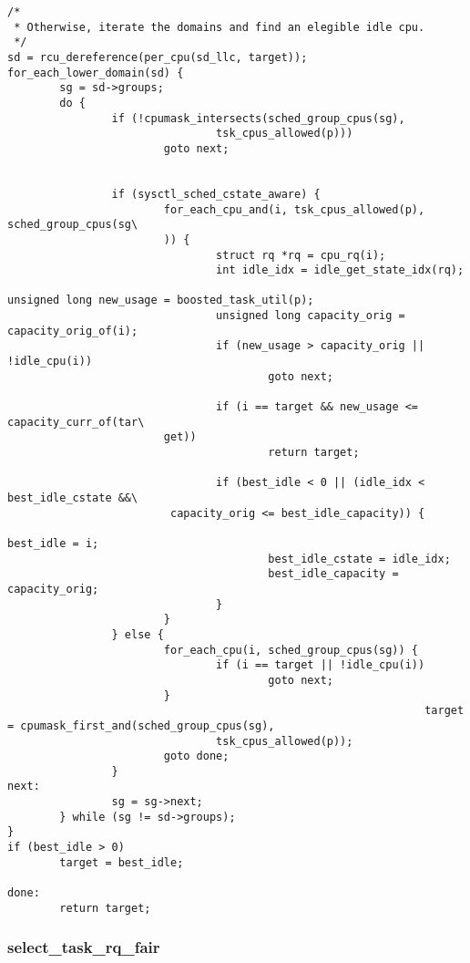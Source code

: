 \documentclass{article}
\begin{document}
\begin{verbatim}
/*
 * Otherwise, iterate the domains and find an elegible idle cpu.
 */
sd = rcu_dereference(per_cpu(sd_llc, target));
for_each_lower_domain(sd) {
        sg = sd->groups;
        do {
                if (!cpumask_intersects(sched_group_cpus(sg),
                                tsk_cpus_allowed(p)))
                        goto next;


                if (sysctl_sched_cstate_aware) {
                        for_each_cpu_and(i, tsk_cpus_allowed(p), sched_group_cpus(sg\
                        )) {
                                struct rq *rq = cpu_rq(i);
                                int idle_idx = idle_get_state_idx(rq);
                                                                                unsigned long new_usage = boosted_task_util(p);
                                unsigned long capacity_orig = capacity_orig_of(i);
                                if (new_usage > capacity_orig || !idle_cpu(i))
                                        goto next;

                                if (i == target && new_usage <= capacity_curr_of(tar\
                        get))
                                        return target;

                                if (best_idle < 0 || (idle_idx < best_idle_cstate &&\
                         capacity_orig <= best_idle_capacity)) {
                                                                                 best_idle = i;
                                        best_idle_cstate = idle_idx;
                                        best_idle_capacity = capacity_orig;
                                }
                        }
                } else {
                        for_each_cpu(i, sched_group_cpus(sg)) {
                                if (i == target || !idle_cpu(i))
                                        goto next;
                        }
                                                                target = cpumask_first_and(sched_group_cpus(sg),
                                tsk_cpus_allowed(p));
                        goto done;
                }
next:
                sg = sg->next;
        } while (sg != sd->groups);
}
if (best_idle > 0)
        target = best_idle;

done:
        return target;
\end{verbatim}
\subsubsection{select\_task\_rq\_fair}
\end{document}
